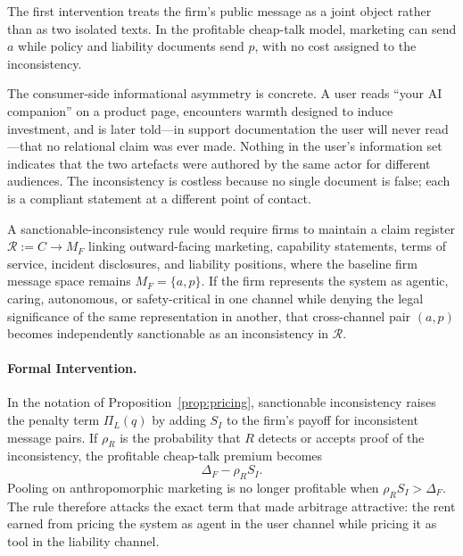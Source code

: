 \documentclass[review,authoryear]{elsarticle}
\theoremstyle{definition}
\theoremstyle{plain}
\begin{document}
The first intervention treats the firm's public message as a joint object rather
than as two isolated texts. In the profitable cheap-talk model, marketing can send $a$
while policy and liability documents send $p$, with no cost assigned to the
inconsistency.

The consumer-side informational asymmetry is concrete. A user reads ``your AI companion'' on a product page, encounters warmth designed to induce investment, and is later told---in support documentation the user will never read---that no relational claim was ever made. Nothing in the user's information set indicates that the two artefacts were authored by the same actor for different audiences. The inconsistency is costless because no single document is false; each is a compliant statement at a different point of contact.

A sanctionable-inconsistency rule would require firms to maintain
a claim register $\mathcal{R} := C \to M_F$ linking outward-facing
marketing, capability statements, terms of service, incident disclosures, and
liability positions, where the baseline firm message space remains
$M_F=\{a,p\}$. If the firm represents the system as agentic, caring, autonomous,
or safety-critical in one channel while denying the legal significance of the
same representation in another, that cross-channel pair $(a,p)$ becomes
independently sanctionable as an inconsistency in $\mathcal{R}$.

\paragraph{Formal Intervention.}
In the notation of Proposition~\ref{prop:pricing}, sanctionable inconsistency
raises the penalty term $\Pi_L(q)$ by adding $S_I$ to the firm's payoff for
inconsistent message pairs.  If $\rho_R$ is the probability that $R$ detects or
accepts proof of the inconsistency, the profitable cheap-talk premium becomes
\[
\Delta_F-\rho_R S_I .
\]
Pooling on anthropomorphic marketing is no longer profitable when
$\rho_R S_I>\Delta_F$.  The rule therefore attacks the exact term that made
arbitrage attractive: the rent earned from pricing the system as agent in the
user channel while pricing it as tool in the liability channel.
\end{document}
